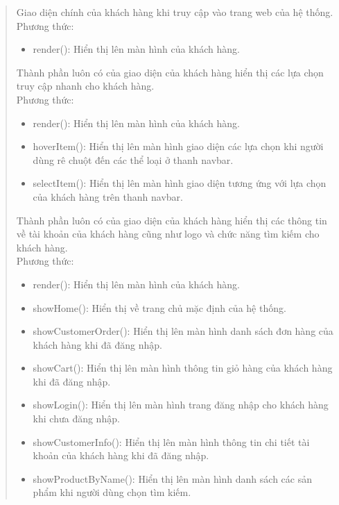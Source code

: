 \begin{quote}

	Giao diện chính của khách hàng khi truy cập vào trang web của hệ thống.\\
	Phương thức:
	\begin{itemize}
		\item render(): Hiển thị lên màn hình của khách hàng.
	\end{itemize}

	Thành phần luôn có của giao diện của khách hàng hiển thị các lựa chọn truy cập nhanh cho khách hàng.\\
	Phương thức:
	\begin{itemize}
		\item render(): Hiển thị lên màn hình của khách hàng.
		\item hoverItem(): Hiển thị lên màn hình giao diện các lựa chọn khi người dùng rê chuột đến các thể loại ở thanh navbar.
		\item selectItem(): Hiển thị lên màn hình giao diện tương ứng với lựa chọn của khách hàng trên thanh navbar.
	\end{itemize}

	Thành phần luôn có của giao diện của khách hàng hiển thị các thông tin về tài khoản của khách hàng cũng như logo và chức năng tìm kiếm cho khách hàng.\\
	Phương thức:
	\begin{itemize}
		\item render(): Hiển thị lên màn hình của khách hàng.
		\item showHome(): Hiển thị về trang chủ mặc định của hệ thống.
		\item showCustomerOrder(): Hiển thị lên màn hình danh sách đơn hàng của khách hàng khi đã đăng nhập.
		\item showCart(): Hiển thị lên màn hình thông tin giỏ hàng của khách hàng khi đã đăng nhập.
		\item showLogin(): Hiển thị lên màn hình trang đăng nhập cho khách hàng khi chưa đăng nhập.
		\item showCustomerInfo(): Hiển thị lên màn hình thông tin chi tiết tài khoản của khách hàng khi đã đăng nhập.
		\item showProductByName(): Hiển thị lên màn hình danh sách các sản phẩm khi người dùng chọn tìm kiếm.
	\end{itemize}


\end{quote}
